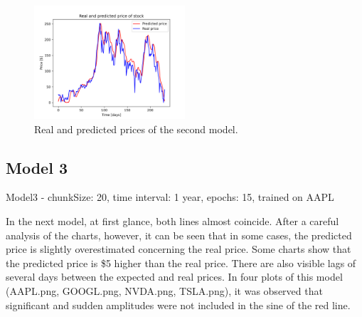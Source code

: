 \begin{figure}
\includegraphics[width=0.5\textwidth]{./graf/model2/TSLA.png}
\caption{Real and predicted prices of the second model.}
\label{fig:label}
\end{figure} 

\clearpage
\subsection{Model 3}

Model3 - chunkSize: 20, time interval: 1 year, epochs: 15, trained on AAPL\par\bigskip
In the next model, at first glance, both lines almost coincide. After a careful analysis of the charts,
however, it can be seen that in some cases, the predicted price is slightly overestimated concerning
the real price. Some charts show that the predicted price is {\$}5 higher than the real price.
There are also visible lags of several days between the expected and real prices. In four plots
of this model (AAPL.png, GOOGL.png, NVDA.png, TSLA.png), it was observed that significant and
sudden amplitudes were not included in the sine of the red line.

